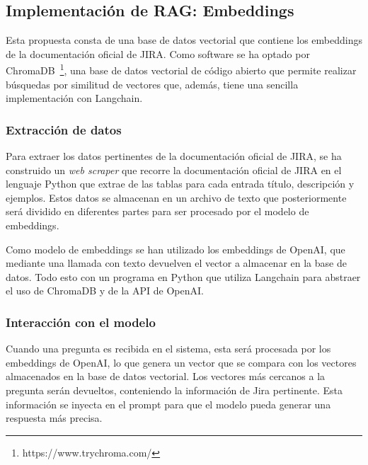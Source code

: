 \subsection{Implementación de RAG: Embeddings}
Esta propuesta consta de una base de datos vectorial que contiene los embeddings de la documentación oficial de JIRA. Como software se ha optado por ChromaDB~\footnote{https://www.trychroma.com/}, una base de datos vectorial de código abierto que permite realizar búsquedas por similitud de vectores que, además, tiene una sencilla implementación con Langchain.

\subsubsection{Extracción de datos}
Para extraer los datos pertinentes de la documentación oficial de JIRA, se ha construido un \textit{web scraper} que recorre la documentación oficial de JIRA en el lenguaje Python que extrae de las tablas para cada entrada título, descripción y ejemplos. Estos datos se almacenan en un archivo de texto que posteriormente será dividido en diferentes partes para ser procesado por el modelo de embeddings.

Como modelo de embeddings se han utilizado los embeddings de OpenAI, que mediante una llamada con texto devuelven el vector a almacenar en la base de datos. Todo esto con un programa en Python que utiliza Langchain para abstraer el uso de ChromaDB y de la API de OpenAI.

\subsubsection{Interacción con el modelo}
Cuando una pregunta es recibida en el sistema, esta será procesada por los embeddings de OpenAI, lo que genera un vector que se compara con los vectores almacenados en la base de datos vectorial. Los vectores más cercanos a la pregunta serán devueltos, conteniendo la información de Jira pertinente. Esta información se inyecta en el prompt para que el modelo pueda generar una respuesta más precisa.